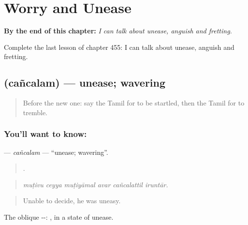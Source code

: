 
\chapter{Worry and Unease}
\label{ch:ta-worry-and-unease}

\begin{chapteropening}
\textbf{By the end of this chapter:} \emph{I can talk about unease, anguish and fretting.}

Complete the last lesson of chapter 455: I can talk about unease, anguish and fretting.
\end{chapteropening}

\section[\texorpdfstring{\ta{சஞ்சலம்} (cañcalam)}{சஞ்சலம் (cañcalam)}]{ (cañcalam) — unease; wavering}

\label{lesson:TA-C455-cancalam}



\begin{quote}
Before the new one: say the Tamil for to be startled, then the Tamil for to tremble.
\end{quote}

\subsection*{You'll want to know: }
\textbf{} — \emph{cañcalam} — \textquotedblleft{}unease; wavering\textquotedblright{}.

\begin{quote}
     .
\end{quote}

\begin{quote}
\emph{muṭivu ceyya muṭiyāmal avar cañcalattil iruntār.}
\end{quote}

\begin{quote}
Unable to decide, he was uneasy.
\end{quote}

The oblique --: , in a state of unease.

